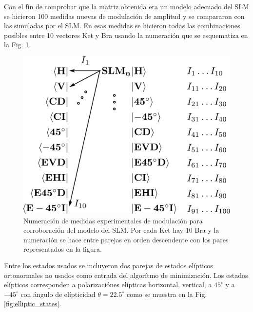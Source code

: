 Con el fín de comprobar que la matriz obtenida era un modelo adecuado
del SLM se hicieron 100 medidas nuevas de modulación de amplitud y se
compararon con las simuladas por el SLM. En esas medidas se hicieron
todas las combinaciones posibles entre 10 vectores Ket y Bra usando la
numeración que se esquematiza en la Fig. \ref{fig:braket_100_notation}.
\begin{figure}[h!]
\centering
\includegraphics[scale=.4]{brakets.pdf}
\caption[Numeración de medidas experimentales de modulación para
corroboración del modelo de SLM]{Numeración de medidas experimentales de modulación para
corroboración del modelo del SLM. Por cada Ket hay 10 Bra y la
numeración se hace entre parejas en orden descendente con los pares
representados en la figura. }
\label{fig:braket_100_notation}
\end{figure}
Entre los estados usados se incluyeron dos parejas de estados
elípticos ortonormales no usados
como entrada del algorítmo de minimización. Los estados elípticos
corresponden a polarizaciónes elípticas horizontal, vertical, a
$45^{\circ}$ y a $-45^{\circ}$ con ángulo de elípticidad $\theta
=22.5^{\circ}$ como se muestra en la Fig. \ref{fig:elliptic_states}.

